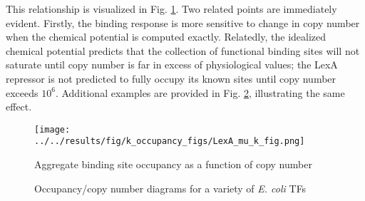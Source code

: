\documentclass{article}
\begin{document}




  This relationship is visualized in Fig.
  \ref{fig:occupancy_vs_copy_number}.  Two related points are
  immediately evident.  Firstly, the binding response is more
  sensitive to change in copy number when the chemical potential is
  computed exactly.  Relatedly, the idealized chemical potential
  predicts that the collection of functional binding sites will not
  saturate until copy number is far in excess of physiological values;
  the LexA repressor is not predicted to fully occupy its known sites
  until copy number exceeds $10^6$.  Additional examples are provided
  in Fig. \ref{fig:occupancy_vs_copy_number_examples}, illustrating
  the same effect.

  \begin{figure}[ht]
    \centering
    \texttt{[image: ../../results/fig/k\_occupancy\_figs/LexA\_mu\_k\_fig.png]}
    \caption{Aggregate binding site occupancy as a function of copy number}
    \label{fig:occupancy_vs_copy_number}
  \end{figure}

  \begin{figure}[ht]
  \centering
{}
  \caption{Occupancy/copy number diagrams for a variety of \textit{E. coli} TFs}
  \label{fig:occupancy_vs_copy_number_examples}
\end{figure}
\end{document}
